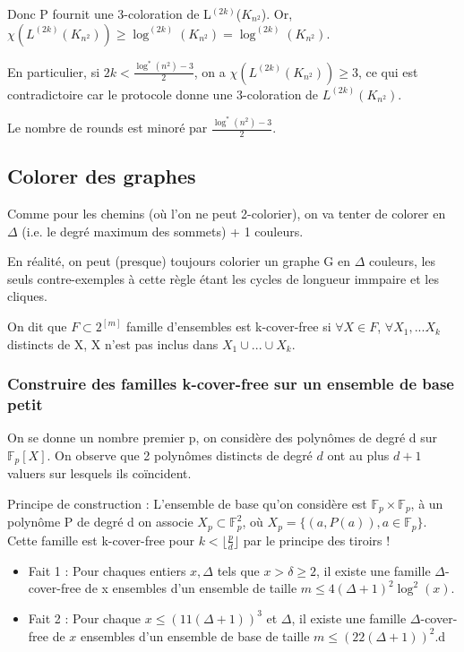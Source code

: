 Donc P fournit une 3-coloration de L$^{(2k)}$($K_{n^2}$). Or, $\chi(L^{(2k)}(K_{n^2})) \ge \log^{(2k)}(K_{n^2}) = \log^{(2k)}(K_{n^2})$.

En particulier, si $2k < \frac{\log^*(n^2) - 3}{2}$, on a $\chi(L^{(2k)}(K_{n^2})) \ge 3$, ce qui est contradictoire car le protocole donne une 3-coloration de $L^{(2k)}(K_{n^2})$.

\begin{theoreme}
	Le nombre de rounds est minoré par $\frac{\log^*(n^2) - 3}{2}$.
\end{theoreme}

\subsection{Colorer des graphes}

Comme pour les chemins (où l'on ne peut 2-colorier), on va tenter de colorer en $\Delta$ (i.e. le degré maximum des sommets) + 1 couleurs.

En réalité, on peut (presque) toujours colorier un graphe G en $\Delta$ couleurs, les seuls contre-exemples à cette règle étant les cycles de longueur immpaire et les cliques.

\begin{definition}
	On dit que $F \subset 2^{[m]}$ famille d'ensembles est k-cover-free si $\forall X \in F$, $\forall X_1,...X_k$ distincts de X, X n'est pas inclus dans $X_1 \cup...\cup X_k$.
\end{definition}

\subsubsection{Construire des familles k-cover-free sur un ensemble de base petit}

On se donne un nombre premier p, on considère des polynômes de degré d sur $\mathbb{F}_p[X]$. On observe que 2 polynômes distincts de degré $d$ ont au plus $d+1$ valuers sur lesquels ils coïncident.

Principe de construction : L'ensemble de base qu'on considère est $\mathbb{F}_p \times \mathbb{F}_p$, à un polynôme P de degré d on associe $X_p \subset \mathbb{F}_p^2$, où $X_p = \{(a,P(a)),a\in \mathbb{F}_p\}$. Cette famille est k-cover-free pour $k < \lfloor \frac{p}{d} \rfloor$ par le principe des tiroirs !

\begin{theoreme}
	\begin{itemize}
		\item Fait 1 : Pour chaques entiers $x, \Delta$ tels que $x > \delta \ge 2$, il existe une famille $\Delta$-cover-free de x ensembles d'un ensemble de taille $m \le 4(\Delta + 1)^2\log^2(x)$.
		\item Fait 2 : Pour chaque $x\le (11(\Delta +1))^3$ et $\Delta$, il existe une famille $\Delta$-cover-free de $x$ ensembles d'un ensemble de base de taille $m \le (22(\Delta +1))^2$.d  
	\end{itemize}
\end{theoreme}
